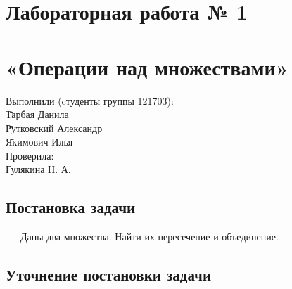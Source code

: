 \documentclass[a4paper,12pt]{extarticle}
\begin{document}

\hspace{0pt}
\vfill
\begin{center}
\section*{Лабораторная работа № 1}
\section*{«Операции над множествами»}
\end{center}
\vfill
\begin{tabbing}
Выполнили (cтуденты группы 121703):\\
\hspace{1em} \= Тарбая Данила\\
\hspace{1em} \= Рутковский Александр\\
\hspace{1em} \= Якимович Илья\\
Проверила:\\
\hspace{1em} \= Гулякина Н. А.\\
\end{tabbing}
\hspace{0pt}
\pagebreak


\newpage
\fancyhf{}
\begin{center}
\section*{Постановка задачи}
\end{center}
\justify\ \ \ Даны два множества. Найти их пересечение и объединение.
\begin{center}
\section*{Уточнение постановки задачи}
\end{center}
\end{document}

